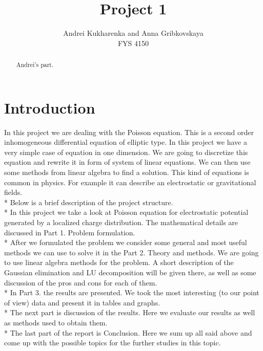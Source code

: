 \documentclass[10pt]{article}
\begin{document}
\setlength\parindent{1pt}
\title{Project 1}
\author{Andrei Kukharenka and Anna Gribkovskaya \\  
FYS 4150 
}

\maketitle
\begin{abstract}
Andrei's part.
\end{abstract}
\clearpage 


\section{Introduction}
In this project we are dealing with the Poisson equation. This is a second order inhomogeneous differential equation of elliptic type. In this project we have a very simple case of equation in one dimension. We are going to discretize this equation and rewrite it in form of system of linear equations. We can then use some methods from linear algebra to find a solution. This kind of equations is common in physics. For example it can describe an electrostatic or gravitational fields.  \\* 
Below is a brief description of the project structure. \\* 
In this project we take a look at Poisson equation for electrostatic potential generated by a localized charge distribution. The mathematical details are discussed in Part 1. Problem formulation.\\* 
After we formulated the problem we consider some general and most useful methods we can use to solve it in the Part 2. Theory and methods. We are going to use linear algebra methods for the problem. A short description of the Gaussian elimination and LU decomposition will be given there, as well as some discussion of the pros and cons for each of them.\\* 
In Part 3. the results are presented. We took the most interesting (to our point of view) data and present it in tables and graphs. \\* 
The next part is discussion of the results. Here we evaluate our results as well as methods used to obtain them. \\* 
The last part of the report is Conclusion. Here we sum up all said above and come up with the possible topics for the further studies  in this topic. 
\end{document}
